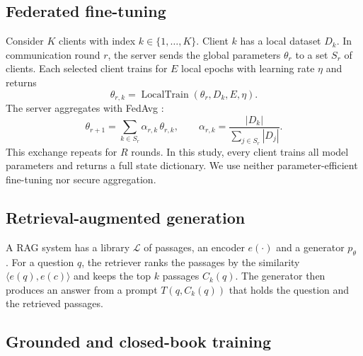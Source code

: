 \documentclass[11pt]{article}
\begin{document}
\subsection{Federated fine-tuning}\label{sec:fl}

Consider $K$ clients with index $k\in\{1,\ldots,K\}$. Client $k$ has a local dataset $D_k$. In communication round $r$, the server sends the global parameters $\theta_r$ to a set $S_r$ of clients. Each selected client trains for $E$ local epochs with learning rate $\eta$ and returns
\begin{equation}
  \theta_{r,k}=\operatorname{LocalTrain}(\theta_r,D_k,E,\eta).
\end{equation}
The server aggregates with FedAvg \citep{mcmahan2017communication}:
\begin{equation}
  \theta_{r+1}=\sum_{k\in S_r}\alpha_{r,k}\,\theta_{r,k},
  \qquad
  \alpha_{r,k}=\frac{|D_k|}{\sum_{j\in S_r}|D_j|}.
  \label{eq:fedavg}
\end{equation}
This exchange repeats for $R$ rounds. In this study, every client trains all model parameters and returns a full state dictionary. We use neither parameter-efficient fine-tuning nor secure aggregation.

\subsection{Retrieval-augmented generation}\label{sec:rag-bg}

A RAG system has a library $\mathcal L$ of passages, an encoder $e(\cdot)$ and a generator $p_\theta$ \citep{lewis2020rag}. For a question $q$, the retriever ranks the passages by the similarity $\langle e(q),e(c)\rangle$ and keeps the top $k$ passages $C_k(q)$. The generator then produces an answer from a prompt $T(q,C_k(q))$ that holds the question and the retrieved passages.

\subsection{Grounded and closed-book training}\label{sec:training-bg}
\end{document}
